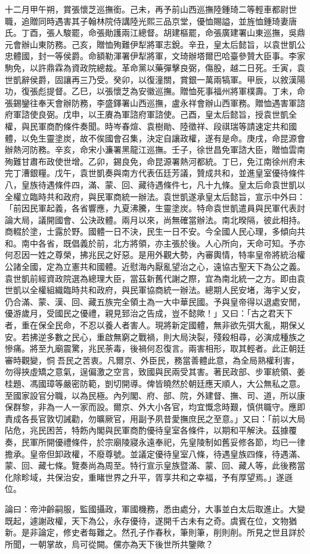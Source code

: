 \begin{pinyinscope}
十二月甲午朔，賞張懷芝巡撫銜。己未，再予前山西巡撫陸鍾琦二等輕車都尉世職，追贈同時遇害其子翰林院侍講陸光熙三品京堂，優恤賜謚，並旌恤鍾琦妻唐氏。丁酉，張人駿罷，命張勛護兩江總督。胡建樞罷，命張廣建署山東巡撫，吳鼎元會辦山東防務。己亥，贈恤殉難伊犁將軍志銳。辛丑，皇太后懿旨，以袁世凱公忠體國，封一等侯爵。命額勒渾署伊犁將軍，文琦辦塔爾巴哈臺參贊大臣事。李家駒免，以許鼎霖為資政院總裁。革命黨以藥彈擊良弼，傷股，越二日死。壬寅，袁世凱辭侯爵，固讓再三乃受。癸卯，以復潼關，賞銀一萬兩犒軍。甲辰，以敘漢陽功，復張彪提督。乙巳，以張懷芝為安徽巡撫。贈恤死事福州將軍樸壽。丁未，命張錫鑾往奉天會辦防務，李盛鐸署山西巡撫，盧永祥會辦山西軍務。贈恤遇害軍諮府軍諮使良弼。戊申，以王賡為軍諮府軍諮使。己酉，皇太后懿旨，授袁世凱全權，與民軍商酌條件奏聞。時岑春煊、袁樹勛、陸徵祥、段祺瑞等請速定共和國體，以免生靈塗炭，故不俟國會召集，決定自讓政權，遂有是命。庚戌，命昆源會辦熱河防務。辛亥，命宋小濂署黑龍江巡撫。壬子，徐世昌免軍諮大臣，贈恤雲南殉難甘肅布政使世增。乙卯，錫良免，命昆源署熱河都統。丁巳，免江南徐州府未完丁漕銀糧。戊午，袁世凱奏與南方代表伍廷芳議，贊成共和，並進皇室優待條件八，皇族待遇條件四，滿、蒙、回、藏待遇條件七，凡十九條。皇太后命袁世凱以全權立臨時共和政府，與民軍商統一辦法。袁世凱遂承皇太后懿旨，宣示中外曰：「前因民軍起義，各省響應，九夏沸騰，生靈塗炭。特命袁世凱遣員與民軍代表討論大局，議開國會、公決政體。兩月以來，尚無確當辦法。南北暌隔，彼此相持。商輟於塗，士露於野。國體一日不決，民生一日不安。今全國人民心理，多傾向共和。南中各省，既倡義於前，北方將領，亦主張於後。人心所向，天命可知。予亦何忍因一姓之尊榮，拂兆民之好惡。是用外觀大勢，內審輿情，特率皇帝將統治權公諸全國，定為立憲共和國體。近慰海內厭亂望治之心，遠協古聖天下為公之義。袁世凱前經資政院選為總理大臣，當茲新舊代謝之際，宜為南北統一之方。即由袁世凱以全權組織臨時共和政府，與民軍協商統一辦法。總期人民安堵，海宇乂安，仍合滿、蒙、漢、回、藏五族完全領土為一大中華民國。予與皇帝得以退處安閒，優游歲月，受國民之優禮，親見郅治之告成，豈不懿歟！」又曰：「古之君天下者，重在保全民命，不忍以養人者害人。現將新定國體，無非欲先弭大亂，期保乂安。若拂逆多數之民心，重啟無窮之戰禍，則大局決裂，殘殺相尋，必演成種族之慘痛。將至九廟震驚，兆民荼毒，後禍何忍復言。兩害相形，取其輕者。此正朝廷審時觀變，恫吾民之苦衷。凡爾京、外臣民，務當善體此意，為全局熟權利害，勿得挾虛矯之意氣，逞偏激之空言，致國與民兩受其害。著民政部、步軍統領、姜桂題、馮國璋等嚴密防範，剴切開導。俾皆曉然於朝廷應天順人，大公無私之意。至國家設官分職，以為民極。內列閣、府、部、院，外建督、撫、司、道，所以康保群黎，非為一人一家而設。爾京、外大小各官，均宜慨念時艱，慎供職守。應即責成各長官敦切誡勸，勿曠厥官，用副予夙昔愛撫庶民之至意。」又曰：「前以大局阽危，兆民困苦，特飭內閣與民軍商酌優待皇室各條件，以期和平解決。茲據覆奏，民軍所開優禮條件，於宗廟陵寢永遠奉祀，先皇陵制如舊妥修各節，均已一律擔承。皇帝但卸政權，不廢尊號。並議定優待皇室八條，待遇皇族四條，待遇滿、蒙、回、藏七條。覽奏尚為周至。特行宣示皇族暨滿、蒙、回、藏人等，此後務當化除畛域，共保治安，重睹世界之升平，胥享共和之幸福，予有厚望焉。」遂遜位。

論曰：帝沖齡嗣服，監國攝政，軍國機務，悉由處分，大事並白太后取進止。大變既起，遽謝政權，天下為公，永存優待，遂開千古未有之奇。虞賓在位，文物猶新。是非論定，修史者每難之。然孔子作春秋，筆則筆，削則削。所見之世且詳於所聞，一朝掌故，烏可從闕。儻亦為天下後世所共鑒歟？


\end{pinyinscope}